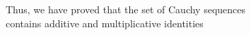 \documentclass[preview]{standalone}
\begin{document}
\begin{center}
Thus, we have proved that the set of Cauchy sequences\\contains additive and multiplicative identities
\end{center}
\end{document}
